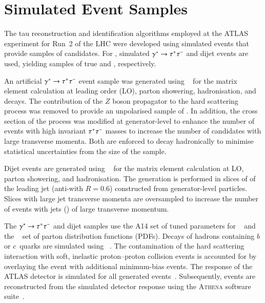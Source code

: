 \section{Simulated Event Samples}%
\label{sec:tauid_mc}

The tau reconstruction and identification algorithms employed at the ATLAS
experiment for Run~2 of the LHC were developed using simulated events that
provide samples of \tauhadvis candidates. For \tauid, simulated
$\gamma^{*} \to \tau^{+} \tau^{-}$ and dijet events are used, yielding samples of true
and \faketauhadvis, respectively.

An artificial $\gamma^{*} \to \tau^{+} \tau^{-}$ event sample was generated
using \PYTHIA[8.212]~\cite{Sjostrand:2014zea} for the matrix element
calculation at leading order (LO), parton showering, hadronisation,
and \tauleptonC decays. The contribution of the $Z$ boson propagator to
the hard scattering process was removed to provide an unpolarised
sample of \tauleptons. In addition, the cross section of the process
was modified at generator-level to enhance the number of events with
high invariant $\tau^{+} \tau^{-}$ masses to increase the number of \tauhadvis
candidates with large transverse momenta. Both \tauleptons
are enforced to decay hadronically to minimise statistical
uncertainties from the size of the \truetauhadvisC sample.

Dijet events are generated using \PYTHIA[8.186]~\cite{Sjostrand:2014zea} for the
matrix element calculation at LO, parton showering, and hadronisation. The
generation is performed in slices of \pT of the leading jet (anti-\kt with
$R = 0.6$) constructed from generator-level particles. Slices with large jet
transverse momenta are oversampled to increase the number of events with jets
(\faketauhadvis) of large transverse momentum.

The $\gamma^{*} \to \tau^{+} \tau^{-}$ and dijet samples use the A14 set of tuned
parameters for \PYTHIA[8]~\cite{ATL-PHYS-PUB-2014-021} and the
\NNPDF[2.3lo]~\cite{Ball:2012cx} set of parton distribution functions (PDFs).
Decays of hadrons containing $b$ or $c$~quarks are simulated using
\EVTGEN[v1.2.0]~\cite{Lange:2001uf}. The contamination of the hard scattering
interaction with soft, inelastic proton--proton collision events is accounted
for by overlaying the event with additional minimum-bias events. The response of
the ATLAS detector is simulated for all generated
events~\cite{SOFT-2010-01}. Subsequently, events are reconstructed from the
simulated detector response using the \textsc{Athena} software
suite~\cite{ATL-SOFT-PUB-2021-001}.


